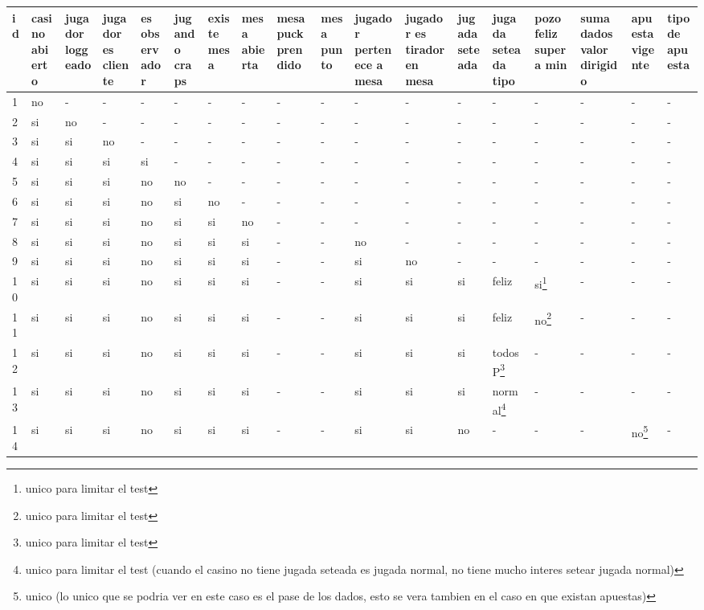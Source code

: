 \documentclass[a4paper, 10pt, notitlepage]{article}
\begin{document}
\begin{landscape}
\begin{tabularx}{1.6\textheight}{|X|X|X|X|X|X|X|X|X|X|X|X|X|X|X|X|X|X|}
\hline
id	&	casino abierto	&	jugador loggeado	& jugador es cliente &	es observador & jugando craps &	existe mesa	&	mesa abierta	&	mesa puck prendido	&	mesa punto	&	jugador pertenece a mesa	&	jugador es tirador en mesa	&	jugada seteada	&	jugada seteada tipo	&	pozo feliz supera min	&	suma dados valor dirigido	&	apuesta vigente	&	tipo de apuesta\\
\hline
1	&	no	&	-	  &	-   &-	  &	-	  &	-	  &	-	  &	-	&	-	&	-	  &	-	  &	-	&	-	&	-	&	-	&	- & -\\
2	&	si	&	no	&	-   & -	  &	-	  &	-	  &	-	  &	-	&	-	&	-	  &	-	  &	-	&	-	&	-	&	-	&	-	&	-\\
3	&	si	&	si	& no  & -  	&	-	  &	-	  &	-	  &	-	&	-	&	-	  &	-	  &	-	&	-	&	-	&	-	&	-	&	-\\
4 &	si	&	si	&	si	&	si	&	-	  &	-	  &	-	  &	-	&	-	&	-	  &	-	  &	-	&	-	&	-	&	-	&	-	&	-\\
5	&	si	&	si	&	si	&	no	&	no	&	-	  &	-	  &	-	&	-	&	-	  &	-	  &	-	&	-	&	-	&	-	&	-	&	-\\
6	&	si	&	si	&	si	&	no	&	si  &	no	&	-	  &	-	&	-	&	-	  &	-	  &	-	&	-	&	-	&	-	&	- & -\\
7	&	si	&	si	&	si	&	no	&	si	&	si  &	no	&	-	&	-	&	-	  &	-	  &	-	&	-	&	-	&	-	&	-	&	-\\
8	&	si	&	si	&	si	&	no	&	si	&	si	&	si	&	-	&	-	&	no	&	-	  &	-	&	-	&	-	&	-	&	-	&	-\\
9	&	si	&	si	&	si	&	no	&	si	&	si	&	si	&	-	&	-	&	si	&	no	&	-	&	-	&	-	&	-	&	-	&	-\\
10&	si	&	si	&	si	&	no	&	si	&	si	&	si	&	-	&	-	&	si	&	si	&	si	&	feliz	&	si\footnote{unico para limitar el test}	&	-	&	-	&	-\\
11	&	si	&	si	&	si	&	no	&	si	&	si	&	si	&	-	&	-	&	si	&	si	&	si	&	feliz	&	no\footnote{unico para limitar el test}	&	-	&	-	&	-\\
12	&	si	&	si	&	si	&	no	&	si	&	si	&	si	&	-	&	-	&	si	&	si	&	si	&	todosP\footnote{unico para limitar el test}	&	-	&	-	&	-	&	-\\
13	&	si	&	si	&	si	&	no	&	si	&	si	&	si	&	-	&	-	&	si	&	si	&	si	&	normal\footnote{unico para limitar el test (cuando el casino no tiene jugada seteada es jugada normal, no tiene mucho interes setear jugada normal)}	&	-	&	-	&	-	&	-\\
14	&	si	&	si	&	si	&	no	&	si	&	si	&	si	&	-	&	-	&	si	&	si	&	no	&	-	&	-	&	-	&	no\footnote{unico (lo unico que se podria ver en este caso es el pase de los dados, esto se vera tambien en el caso en que existan apuestas)}	&	-\\

\end{tabularx}
\end{landscape}
\end{document}
